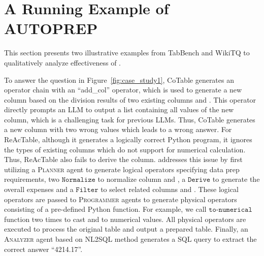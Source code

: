 \section{A Running Example of AUTOPREP}
\label{sec:appendix_a_running_example_of_autoprep}





This section presents two illustrative examples from TabBench and WikiTQ to qualitatively analyze effectiveness of \sys. 

To answer the question in Figure~\ref{fig:case_study1}, CoTable generates an operator chain with an ``add\_col'' operator, which is used to generate a new column  based on the division results of two existing columns  and . This operator directly prompts an LLM to output a list containing all values of the new column, which is a challenging task for previous LLMs. Thus, CoTable generates a new column with two wrong values which leads to a wrong answer. For ReAcTable, although it generates a logically correct Python program, it ignores the types of existing columns which do not support for numerical calculation. Thus, ReAcTable also fails to derive the  column.
\sys addresses this issue by first utilizing a \textsc{Planner} agent to generate logical operators specifying data prep requirements, \ie two $\mathtt{Normalize}$ to normalize column  and , a $\mathtt{Derive}$ to generate the overall expenses  and a $\mathtt{Filter}$ to select related columns  and . 
These logical operators are passed to \textsc{Programmer} agents to generate physical operators consisting of a pre-defined Python function. For example, we call $\mathtt{to\mbox{-}numerical}$ function two times to cast  and  to numerical values.
All physical operators are executed to process the original table and output a prepared table. Finally, an \textsc{Analyzer} agent based on NL2SQL method generates a SQL query to extract the correct answer ``4214.17''.


